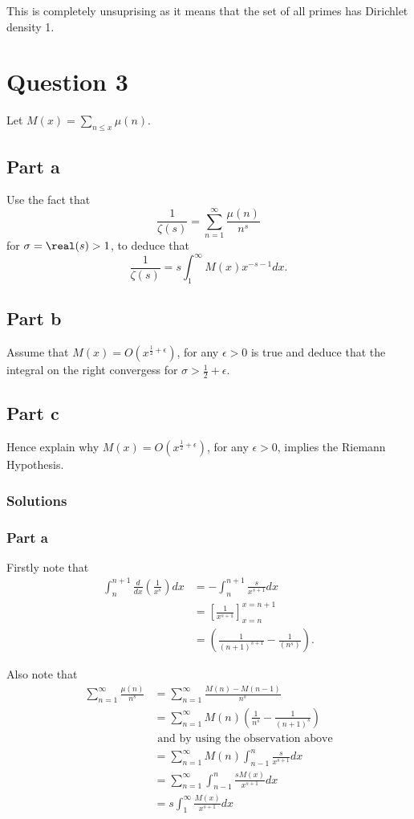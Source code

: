\documentclass{unswmaths}
\begin{document}
This is completely unsuprising as it means that the set of all primes has Dirichlet density 1.
\section*{Question 3}

Let $ M(x) = \sum_{n \leq x} \mu(n) $.

\subsection*{Part a}

Use the fact that 
$$
	\frac{1}{\zeta(s)} = \sum_{n =1}^\infty \frac{\mu(n)}{n^s}
$$
for $ \sigma = \real(s) > 1 $, to deduce that 
$$
	\frac{1}{\zeta(s)} = s \int_1^\infty M(x)x^{-s-1} dx.
$$

\subsection*{Part b}
Assume that $ M(x) = O(x^{\frac{1}{2} + \epsilon}) $, for any $ \epsilon > 0 $ is true and deduce 
that the integral on the right convergess for $ \sigma > \frac{1}{2} + \epsilon $.

\subsection*{Part c}

Hence explain why $ M(x) = O(x^{\frac{1}{2} + \epsilon}) $, for any $ \epsilon > 0 $, implies the Riemann Hypothesis.

\subsubsection*{Solutions}

\subsubsection*{Part a}

Firstly note that
\begin{align*}
	\int_{n}^{n+1} \frac{d}{dx}\left( \frac{1}{x^s} \right) dx &= -\int_{n}^{n+1}\frac{s}{x^{s+1}}dx \\
		&= \left[ \frac{1}{x^{s+1}} \right]_{x = n}^{x=n+1} \\
		&= \left( \frac{1}{(n+1)^{s+1}} - \frac{1}{(n^s)} \right).
\end{align*}

Also note that
\begin{align*}
	\sum_{n=1}^\infty \frac{\mu(n)}{n^s} &= \sum_{n=1}^\infty \frac{M(n) - M(n-1)}{n^s} \\
		&= \sum_{n=1}^\infty M(n) \left( \frac{1}{n^s} - \frac{1}{(n+1)^s} \right) \\
		& \text{ and by using the observation above} \\
		&= \sum_{n=1}^\infty M(n) \int_{n-1}^n \frac{s}{x^{s+1}} dx \\
		&= \sum_{n=1}^\infty \int_{n-1}^n \frac{s M(x)}{x^{s+1}} dx \\
		&= s \int_1^\infty\frac{M(x)}{x^{s+1}} dx
\end{align*}
\end{document}
